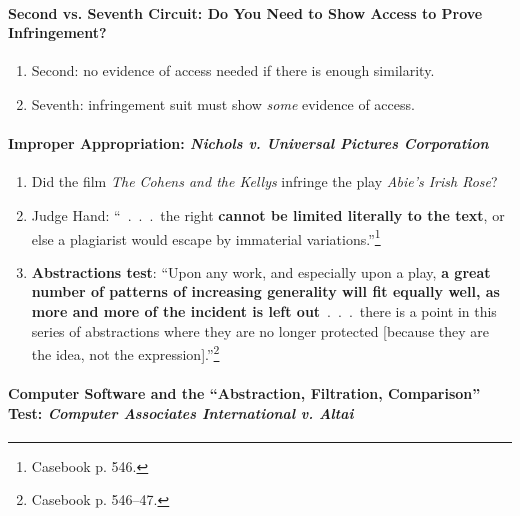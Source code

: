 \paragraph{Second vs. Seventh Circuit: Do You Need to Show Access to Prove 
Infringement?}

\begin{enumerate}
    \item Second: no evidence of access needed if there is enough similarity.
    \item Seventh: infringement suit must show \emph{some} evidence of access.
\end{enumerate}

\paragraph{Improper Appropriation: \emph{Nichols v. Universal Pictures 
Corporation}}

\begin{enumerate}
    \item Did the film \emph{The Cohens and the Kellys} infringe the play 
    \emph{Abie's Irish Rose}?
    \item Judge Hand: ``~.~.~.~the right \textbf{cannot be limited literally 
    to the text}, or else a plagiarist would escape by immaterial 
    variations.''\footnote{Casebook p. 546.}
    \item \textbf{Abstractions test}: ``Upon any work, and especially upon a 
    play, \textbf{a great number of patterns of increasing generality will fit 
    equally well, as more and more of the incident is left out}~.~.~.~there is 
    a point in this series of abstractions where they are no longer protected 
    [because they are the idea, not the expression].''\footnote{Casebook p. 
    546--47.}
\end{enumerate}

\paragraph{Computer Software and the ``Abstraction, Filtration, Comparison'' 
Test: \emph{Computer Associates International v. Altai}}

